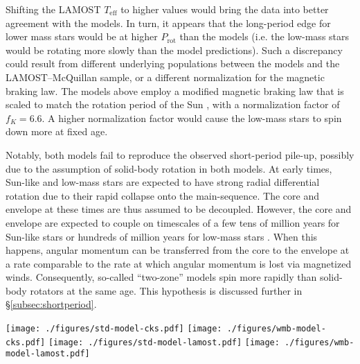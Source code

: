 \documentclass[linenumbers,trackchanges,twocolumn]{aastex631}
\newcommand{\lamostmcq}{LAMOST--McQuillan\xspace}
\newcommand{\teff}{\ensuremath{T_{\mathrm{eff}}}\xspace}
\newcommand{\logg}{\ensuremath{\log g}\xspace}
\newcommand{\prot}{\ensuremath{P_\mathrm{rot}}\xspace}
\begin{document}
Shifting the LAMOST \teff to higher values would bring the data into better agreement with the models. In turn, it appears that the long-period edge for lower mass stars would be at higher \prot than the models (i.e. the low-mass stars would be rotating more slowly than the model predictions). Such a discrepancy could result from different underlying populations between the models and the \lamostmcq sample, or a different normalization for the magnetic braking law. The models above employ a modified magnetic braking law that is scaled to match the rotation period of the Sun \citep[see equations 1 \& 2 of][]{vanSaders2013}, with a normalization factor of $f_K = 6.6$. A higher normalization factor would cause the low-mass stars to spin down more at fixed age.

Notably, both models fail to reproduce the observed short-period pile-up, possibly due to the assumption of solid-body rotation in both models. At early times, Sun-like and low-mass stars are expected to have strong radial differential rotation due to their rapid collapse onto the main-sequence. The core and envelope at these times are thus assumed to be decoupled. However, the core and envelope are expected to couple on timescales of a few tens of million years for Sun-like stars \citep{Denissenkov2010, GalletBouvier2015, Lanzafame2015} or hundreds of million years for low-mass stars \citep{GalletBouvier2015,Lanzafame2015,Somers2016}. When this happens, angular momentum can be transferred from the core to the envelope at a rate comparable to the rate at which angular momentum is lost via magnetized winds. Consequently, so-called ``two-zone'' models \citep{MacGregor1991} spin more rapidly than solid-body rotators at the same age. This hypothesis is discussed further in \S\ref{subsec:shortperiod}.

\begin{figure*}
    \centering 
    \texttt{[image: ./figures/std-model-cks.pdf]}
    \texttt{[image: ./figures/wmb-model-cks.pdf]}
    \texttt{[image: ./figures/std-model-lamost.pdf]}
    \texttt{[image: ./figures/wmb-model-lamost.pdf]}
    \caption{The \teff-\prot plane for the CKS sample (top panels) and LAMOST sample (bottom panels) in comparison to the standard and WMB models (2-d histograms) presented in \citet{vanSaders2019}. Shown here are stars with \logg~$>$~4.1. Rotation periods for the CKS sample here are sourced from the \citet{David2021} compilation. The black symbol in each panel indicates the position of the Sun.}
    \label{fig:models}
\end{figure*}
\end{document}
